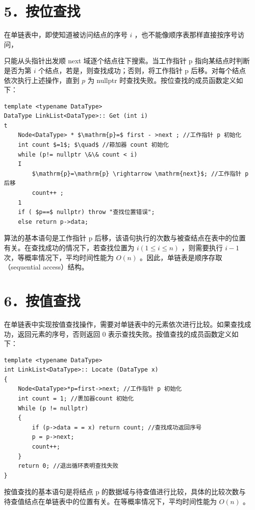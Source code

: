 \documentclass[10pt]{article}
\begin{document}
\section*{5．按位查找}
在单链表中，即使知道被访问结点的序号 $i$ ，也不能像顺序表那样直接按序号访问，

只能从头指针出发顺 next 域逐个结点往下搜索。当工作指针 p 指向某结点时判断是否为第 $i$ 个结点，若是，则查找成功；否则，将工作指针 p 后移。对每个结点依次执行上述操作，直到 $p$ 为 nullptr 时查找失败。按位查找的成员函数定义如下：

\begin{verbatim}
template <typename DataType>
DataType LinkList<DataType>:: Get (int i)
t
    Node<DataType> * $\mathrm{p}=$ first - >next ; //工作指针 p 初始化
    int count $=1$; $\quad$ //䉘加器 count 初始化
    while (p!= nullptr \&\& count < i)
    I
        $\mathrm{p}=\mathrm{p} \rightarrow \mathrm{next}$; //工作指针 p 后移
        count++ ;
    1
    if ( $p==$ nullptr) throw "查找位置错误";
    else return p->data;
\end{verbatim}

算法的基本语句是工作指针 p 后移，该语句执行的次数与被查结点在表中的位置有关。在查找成功的情况下，若查找位置为 $i(1 \leqslant i \leqslant n)$ ，则需要执行 $i-1$ 次，等概率情况下，平均时间性能为 $O(n)$ 。因此，单链表是顺序存取（sequential access）结构。

\section*{6．按值查找}
在单链表中实现按值查找操作，需要对单链表中的元素依次进行比较。如果查找成功，返回元素的序号，否则返回 0 表示查找失败。按值查找的成员函数定义如下：

\begin{verbatim}
template <typename DataType>
int LinkList<DataType>:: Locate (DataType x)
{
    Node<DataType>*p=first->next; //工作指针 p 初始化
    int count = 1; //褁加器count 初始化
    While (p != nullptr)
    {
        if (p->data = = x) return count; //查找成功返回序号
        p = p->next;
        count++;
    }
    return 0; //退出循环表明查找失败
}
\end{verbatim}

按值查找的基本语句是将结点 p 的数据域与待查值进行比较，具体的比较次数与待查值结点在单链表中的位置有关。在等概率情况下，平均时间性能为 $O(n)$ 。
\end{document}
